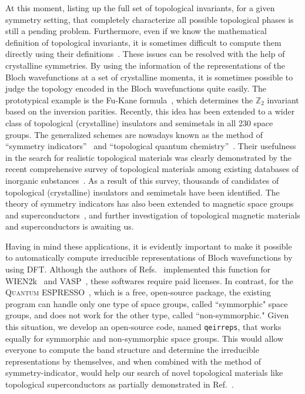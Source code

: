 \documentclass[3p,preprint]{elsarticle}
\begin{document}
At this moment, listing up the full set of topological invariants, for a given symmetry setting, that completely characterize all possible topological phases is still a pending problem.  Furthermore, even if we know the mathematical definition of topological invariants, it is sometimes difficult to compute them directly using their definitions~\cite{PhysRevB.91.155120, Wang:2016aa,PhysRevB.91.161105}.  These issues can be resolved with the help of crystalline symmetries.  By using the information of the representations of the Bloch wavefunctions at a set of crystalline momenta, it is sometimes possible to judge the topology encoded in the Bloch wavefunctions quite easily.  The prototypical example is the Fu-Kane formula~\cite{Fu-Kane}, which determines the $\mathbb{Z}_2$ invariant based on the inversion parities. Recently, this idea has been extended to a wider class of topological (crystalline) insulators and semimetals in all 230 space groups. The generalized schemes are nowadays known as the method of ``symmetry indicators''~\cite{Po2017,SI_Adrian} and ``topological quantum chemistry''~\cite{TQC}.  Their usefulness in the search for realistic topological materials was clearly demonstrated by the recent comprehensive survey of topological materials among existing databases of inorganic substances~\cite{Tang2019_NP,Tangeaau8725,Zhang2019,Vergniory2019,Tang2019}.  As a result of this survey, thousands of candidates of topological (crystalline) insulators and semimetals have been identified.  The theory of symmetry indicators has also been extended to magnetic space groups~\cite{Watanabeeaat8685} and superconductors~\cite{Ono-Watanabe2018,Ono-Yanase-Watanabe2019,Skurativska2019,1907.13632, Ono-Po-Watanabe2020, SI_Luka}, and further investigation of topological magnetic materials and superconductors is awaiting us.

Having in mind these applications, it is evidently important to make it possible to automatically compute irreducible representations of Bloch wavefunctions by using DFT. 
Although the authors of Refs.~\cite{Tang2019_NP,Tangeaau8725,Zhang2019,Vergniory2019,Tang2019, irvsp} implemented this function for WIEN2k~\cite{wien2k} and VASP~\cite{vasp}, these softwares require paid licenses.  In contrast, for the \textsc{Quantum ESPRESSO}~\cite{qe1,qe2}, which is a free, open-source package, the existing program can handle only one type of space groups, called ``symmorphic"  space groups, and does not work for the other type, called ``non-symmorphic." Given this situation, we develop an open-source code, named \texttt{qeirreps}, that works equally for symmorphic and non-symmorphic space groups.  This would allow everyone to compute the band structure and determine the irreducible representations by themselves, and when combined with the method of symmetry-indicator, would help our search of novel topological materials like topological superconductors as partially demonstrated in Ref.~\cite{Ono-Po-Shiozaki2020}.
\end{document}
